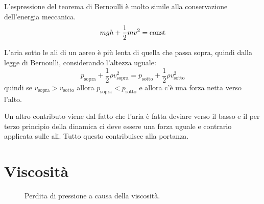 L'espressione del teorema di Bernoulli è molto simile alla conservazione dell'energia meccanica.
\[mgh+\frac{1}{2}mv^2=\text{const}\]
\begin{Es}
   L'aria sotto le ali di un aereo è più lenta di quella che passa sopra, quindi dalla legge di Bernoulli, considerando l'altezza uguale:
   \[p_\text{sopra}+\frac{1}{2}\rho v_\text{sopra}^2=p_\text{sotto}+\frac{1}{2}\rho v_\text{sotto}^2\]
   quindi se $v_\text{sopra}>v_\text{sotto}$ allora $p_\text{sopra}<p_\text{sotto}$ e allora c'è una forza netta verso l'alto.

   Un altro contributo viene dal fatto che l'aria è fatta deviare verso il basso e il per terzo principio della dinamica ci deve essere una forza uguale e contrario applicata sulle ali. Tutto questo contribuisce alla portanza.
\end{Es}
\section{Viscosità}
\label{viscosita fisica1}
\begin{figure}[htbp]
   \centering
   \quad
   \caption{Perdita di pressione a causa della viscosità.}
\end{figure}

